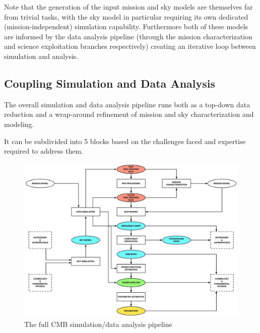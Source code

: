 Note that the generation of the input mission and sky models are themselves far from trivial tasks, with the sky model in particular requiring its own dedicated (mission-independent) simulation capability. Furthermore both of these models are informed by the data analysis pipeline (through the mission characterization and science exploitation branches respectively) creating an iterative loop between simulation and analysis.

\newpage

\subsection{Coupling Simulation and Data Analysis}

The overall simulation and data analysis pipeline runs both as a top-down data reduction and a wrap-around refinement of mission and sky characterization and modeling.

It can be subdivided into 5 blocks based on the challenges faced and expertise required to address them.

\begin{figure}[htbp]
\centering
\includegraphics[width=1\textwidth]{Analysis/simda}
\caption{The full CMB simulation/data analysis pipeline}
\label{default}

\end{figure}

\newpage



\newpage



\newpage



\newpage



\newpage



\newpage

%



